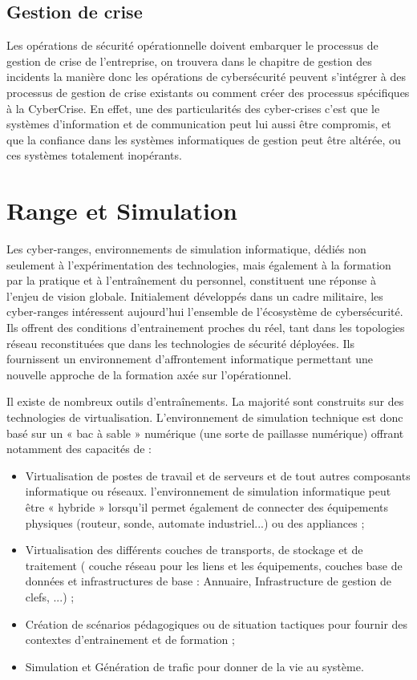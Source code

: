 \subsection{Gestion de crise}

Les opérations de sécurité opérationnelle doivent embarquer le processus de gestion de crise de l'entreprise, on trouvera dans le chapitre de gestion des incidents la manière donc les opérations de cybersécurité peuvent s'intégrer à des processus de gestion de crise existants ou comment créer des processus spécifiques à la CyberCrise. En effet, une des particularités des cyber-crises c'est que le systèmes d'information et de communication peut lui aussi être compromis, et que la confiance dans les systèmes informatiques de gestion peut être altérée, ou ces systèmes totalement inopérants.  

\section{Range et Simulation}

Les cyber-ranges, environnements de simulation informatique, dédiés non seulement à l’expérimentation des technologies, mais également à la formation par la pratique et à l’entraînement du personnel, constituent une réponse à l'enjeu de vision globale.  Initialement développés dans un cadre militaire,  les  cyber-ranges intéressent aujourd’hui l’ensemble de l’écosystème de cybersécurité. Ils offrent des conditions d’entrainement proches du réel, tant dans les topologies réseau reconstituées que dans les technologies de sécurité déployées. Ils fournissent un environnement d’affrontement informatique permettant une nouvelle approche de la formation axée sur l’opérationnel.

Il existe de nombreux outils d'entraînements. La majorité sont construits sur des technologies de virtualisation.
L’environnement de simulation technique est donc basé sur un « bac à sable » numérique (une sorte de paillasse numérique) offrant notamment des capacités de :
\begin{itemize}
  \item Virtualisation de postes de travail et de serveurs  et de tout autres composants informatique ou réseaux. l'environnement de simulation informatique peut être  « hybride » lorsqu’il permet également de connecter des équipements physiques (routeur, sonde, automate industriel...) ou des appliances ;
  \item Virtualisation des différents couches de transports, de stockage et de traitement ( couche réseau pour les liens et les équipements, couches base de données et infrastructures de base : Annuaire, Infrastructure de gestion de clefs, ...) ; 
  \item  Création de scénarios pédagogiques ou de situation tactiques pour fournir des contextes d'entrainement et de formation ;
  \item  Simulation et Génération de trafic pour donner de la vie au système.

\end{itemize}

